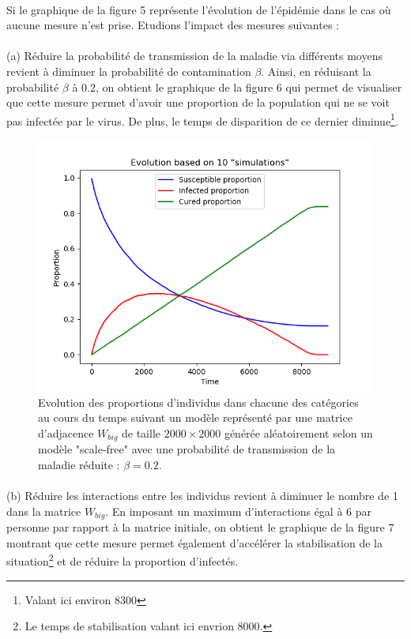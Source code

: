 \documentclass[a4paper, 12pt, oneside]{article}
\begin{document}
\paragraph{}Si le graphique de la figure 5 représente l'évolution de l'épidémie dans le cas où aucune mesure n'est prise. Etudions l'impact des mesures suivantes :

\paragraph{}(a) Réduire la probabilité de transmission de la maladie via différents moyens revient à diminuer la probabilité de contamination $\beta$. Ainsi, en réduisant la probabilité $\beta$ à 0.2, on obtient le graphique de la figure 6 qui permet de visualiser que cette mesure permet d'avoir une proportion de la population qui ne se voit pas infectée par le virus. De plus, le temps de disparition de ce dernier diminue\footnote{Valant ici environ 8300}.

\begin{figure}[H]
	\centering
	\includegraphics[scale=1]{Wbig_dense_reduction_transmission.png} 
	\caption{Evolution des proportions d'individus dans chacune des catégories au cours du temps suivant un modèle représenté par une matrice d'adjacence $W_{big}$ de taille $2000 \times 2000$ générée aléatoirement selon un modèle "scale-free" avec une probabilité de transmission de la maladie réduite : $\beta = 0.2$.}
\end{figure}


\paragraph{}(b) Réduire les interactions entre les individus revient à diminuer le nombre de 1 dans la matrice $W_{big}$. En imposant un maximum d'interactions égal à 6 par personne par rapport à la matrice initiale, on obtient le graphique de la figure 7 montrant que cette mesure permet également d'accélérer la stabilisation de la situation\footnote{Le temps de stabilisation valant ici envrion 8000.} et de réduire la proportion d'infectés.
\end{document}
